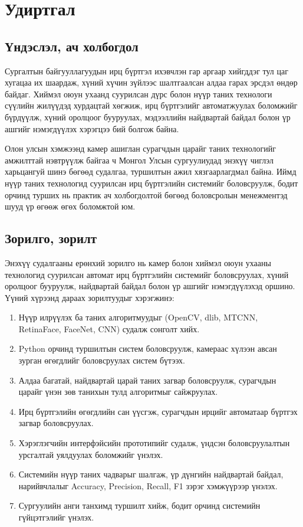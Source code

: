 \chapter{Удиртгал}
\section{Үндэслэл, ач холбогдол}
Сургалтын байгууллагуудын ирц бүртгэл ихэвчлэн гар аргаар хийгддэг тул цаг хугацаа их шаардаж, хүний хүчин зүйлээс шалтгаалсан алдаа гарах эрсдэл өндөр байдаг. Хиймэл оюун ухаанд суурилсан дүрс болон нүүр таних технологи сүүлийн жилүүдэд хурдацтай хөгжиж, ирц бүртгэлийг автоматжуулах боломжийг бүрдүүлж, хүний оролцоог бууруулах, мэдээллийн найдвартай байдал болон үр ашгийг нэмэгдүүлэх хэрэгцээ бий болгож байна.

Олон улсын хэмжээнд камер ашиглан сурагчдын царайг таних технологийг амжилттай нэвтрүүлж байгаа ч Монгол Улсын сургуулиудад энэхүү чиглэл харьцангуй шинэ бөгөөд судалгаа, туршилтын ажил хязгаарлагдмал байна. Иймд нүүр таних технологид суурилсан ирц бүртгэлийн системийг боловсруулж, бодит орчинд турших нь практик ач холбогдолтой бөгөөд боловсролын менежментэд шууд үр өгөөж өгөх боломжтой юм.

\section{Зорилго, зорилт}
Энэхүү судалгааны ерөнхий зорилго нь камер болон хиймэл оюун ухааны технологид суурилсан автомат ирц бүртгэлийн системийг боловсруулах, хүний оролцоог бууруулж, найдвартай байдал болон үр ашгийг нэмэгдүүлэхэд оршино. Үүний хүрээнд дараах зорилтуудыг хэрэгжинэ:
\begin{enumerate}
	\item Нүүр илрүүлэх ба таних алгоритмуудыг (OpenCV, dlib, MTCNN, RetinaFace, FaceNet, CNN) судалж сонголт хийх.
	\item Python орчинд туршилтын систем боловсруулж, камераас хүлээн авсан зурган өгөгдлийг боловсруулах систем бүтээх.
	\item Алдаа багатай, найдвартай царай таних загвар боловсруулж, сурагчдын царайг үнэн зөв танихын тулд алгоритмыг сайжруулах.
    \item Ирц бүртгэлийн өгөгдлийн сан үүсгэж, сурагчдын ирцийг автоматаар бүртгэх загвар боловсруулах.
	\item Хэрэглэгчийн интерфэйсийн прототипийг судалж, үндсэн боловсруулалтын урсгалтай уялдуулах боломжийг үнэлэх.
	\item Системийн нүүр таних чадварыг шалгаж, үр дүнгийн найдвартай байдал, нарийвчлалыг Accuracy, Precision, Recall, F1 зэрэг хэмжүүрээр үнэлэх.
	\item Сургуулийн анги танхимд туршилт хийж, бодит орчинд системийн гүйцэтгэлийг үнэлэх.
\end{enumerate}

